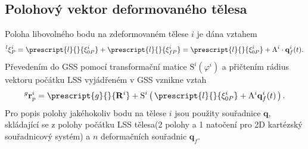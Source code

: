 \subsection{Polohový vektor deformovaného tělesa}

Poloha libovolného bodu na zdeformovaném tělese $ i $ je dána vztahem
\begin{equation}\label{eq:MBS_xiP}
	^l\mathbf{\xi}^i_P = \prescript{l}{}{\mathbf{\xi}^i_{0P}} + \prescript{l}{}{\mathbf{\xi}^i_{fP}}  = \prescript{l}{}{\mathbf{\xi}^i_{0P}}  + \mathrm{A}^i \cdot \mathbf{q}_f^i(t).
\end{equation}
Převedením do GSS pomocí transformační matice $ \mathrm{S}^i(\varphi^i) $ a přičtením rádius vektoru počátku LSS vyjádřeném v GSS vznikne vztah
\begin{equation}\label{eq:MBS_rp}
	^g\mathbf{r}_p^i = \prescript{g}{}{\mathbf{R}^i} + \mathrm{S}^{i}\left(\, \prescript{l}{}{\mathbf{\xi}^i_{0P}}  + \mathrm{A}^i \mathbf{q}_f^i(t) \,	\right).
\end{equation}
Pro popis polohy jakéhokoliv bodu na tělese $ i $ jsou použity souřadnice $ \mathbf{q} $, skládající se z polohy počátku LSS tělesa(2 polohy a 1 natočení pro 2D kartézský souřadnicový systém) a $ n $ deformačních souřadnic $ \mathbf{q}_f $.

